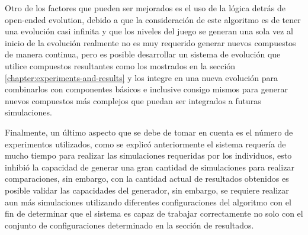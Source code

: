 Otro de los factores que pueden ser mejorados es el uso de la lógica detrás de
open-ended evolution, debido a que la consideración de este algoritmo es de
tener una evolución casi infinita y que los niveles del juego se generan una
sola vez al inicio de la evolución realmente no es muy requerido generar nuevos
compuestos de manera continua, pero es posible desarrollar un sistema de
evolución que utilice compuestos resultantes como los mostrados en la sección
\ref{chapter:experiments-and-results} y los integre en una nueva evolución para
combinarlos con componentes básicos e inclusive consigo mismos para generar
nuevos compuestos más complejos que puedan ser integrados a futuras
simulaciones.

Finalmente, un último aspecto que se debe de tomar en cuenta es el número de
experimentos utilizados, como se explicó anteriormente el sistema requería de
mucho tiempo para realizar las simulaciones requeridas por los individuos, esto
inhibió la capacidad de generar una gran cantidad de simulaciones para realizar
comparaciones, sin embargo, con la cantidad actual de resultados obtenidos es
posible validar las capacidades del generador, sin embargo, se requiere realizar
aun más simulaciones utilizando diferentes configuraciones del algoritmo con el
fin de determinar que el sistema es capaz de trabajar correctamente no solo con
el conjunto de configuraciones determinado en la sección de resultados. 
